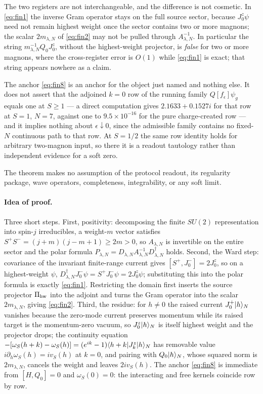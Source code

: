 \begin{scope}
\label{scope:soft-index-su2}
The two registers are not interchangeable, and the difference is not
cosmetic. In \cref{eq:fin1} the inverse Gram operator stays on the full source
sector, because $J^z_0\psi$ need not remain highest weight once the sector
contains two or more magnons; the scalar $2m_{\lambda,N}$ of \cref{eq:fin2}
may not be pulled through $A_{\lambda,N}^{-1}$. In particular the string
$m_{\lambda,N}^{-1}Q_0J^z_0$, without the highest-weight projector, is
\emph{false} for two or more magnons, where the cross-register error is
$O(1)$ while \cref{eq:fin1} is exact; that string appears nowhere as a claim.

The anchor \cref{eq:fin8} is an anchor for the object just named and nothing
else. It does not assert that the adjoined $k=0$ row of the running family
$Q[f_\epsilon]\psi_g$ equals one at $S\ge1$ --- a direct computation gives
$2.1633+0.1527i$ for that row at $S=1$, $N=7$, against one to
$9.5\times10^{-16}$ for the pure charge-created row --- and it implies nothing
about $\epsilon\downarrow0$, since the admissible family contains no
fixed-$N$ continuous path to that row. At $S=1/2$ the same row identity holds
for arbitrary two-magnon input, so there it is a readout tautology rather than
independent evidence for a soft zero.

The theorem makes no assumption of the protocol readout, its regularity
package, wave operators, completeness, integrability, or any soft limit.
\end{scope}

\paragraph{Idea of proof.} Three short steps. First, positivity: decomposing
the finite $SU(2)$ representation into spin-$j$ irreducibles, a weight-$m$
vector satisfies $S^+S^-=(j+m)(j-m+1)\ge 2m>0$, so $A_{\lambda,N}$ is
invertible on the entire sector and the polar formula
$P_{\lambda,N}=D_{\lambda,N}A_{\lambda,N}^{-1}D_{\lambda,N}^\dagger$ holds.
Second, the Ward step: covariance of the invariant finite-range current gives
$[S^+,J^-_0]=2J^z_0$, so on a highest-weight $\psi$,
$D_{\lambda,N}^\dagger J^-_0\psi=S^+J^-_0\psi=2J^z_0\psi$; substituting this
into the polar formula is exactly \cref{eq:fin1}. Restricting the domain
first inserts the source projector $\Pi_{\rm hw}$ into the adjoint and turns
the Gram operator into the scalar $2m_{\lambda,N}$, giving \cref{eq:fin2}.
Third, the residue: for $h\neq0$ the raised current $J^+_0|h\rangle_N$ vanishes
because the zero-mode current preserves momentum while its raised target is
the momentum-zero vacuum, so $J^z_0|h\rangle_N$ is itself highest weight and the
projector drops; the continuity equation
$-[\omega_S(h+k)-\omega_S(h)]=(e^{ik}-1)\langle h+k|J^z_k|h\rangle_N$ has removable
value $i\partial_h\omega_S(h)=iv_S(h)$ at $k=0$, and pairing with
$Q_0|h\rangle_N$, whose squared norm is $2m_{\lambda,N}$, cancels the weight and
leaves $2iv_S(h)$. The anchor \cref{eq:fin8} is immediate from
$[H,Q_0]=0$ and $\omega_S(0)=0$: the interacting and free kernels coincide row
by row.

